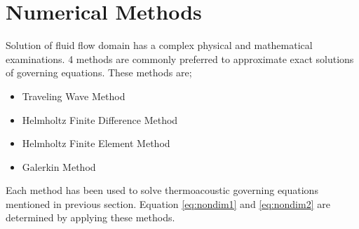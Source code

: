 \cleardoublepage
{}
\section{Numerical Methods}


Solution of fluid flow domain has a complex physical and mathematical examinations. 4 methods are commonly preferred to approximate exact solutions of governing  equations. These methods are;
\begin{itemize}
	\item Traveling Wave Method
	\item Helmholtz Finite Difference Method
	\item Helmholtz Finite Element Method
	\item Galerkin Method
\end{itemize}

Each method has been used to solve thermoacoustic governing equations mentioned in previous section. Equation \ref{eq:nondim1} and \ref{eq:nondim2} are determined by applying these methods.


